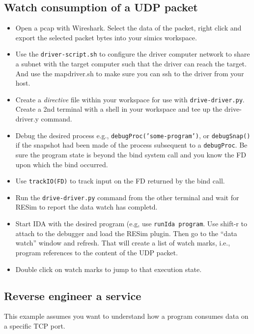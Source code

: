 \documentclass[titlepage]{article}
\begin{document}
\subsection{Watch consumption of a UDP packet}
\begin{itemize}
\item Open a pcap with Wireshark. Select the data of the packet, right click and export the selected packet bytes into your simics workspace.

\item Use the {\tt driver-script.sh} to configure the driver computer network to share a subnet with the target computer such that the driver
can reach the target.  And use the mapdriver.sh to make sure you can ssh to the driver from your host.

\item Create a \textit{directive} file within your workspace for use with {\tt drive-driver.py}.  Create a 2nd terminal with a shell in your workspace
and tee up the drive-driver.y command.

\item Debug the desired process e.g., {\tt debugProc('some-program')}, or {\tt debugSnap()} if the snapshot had been made of the process subsequent
to a {\tt debugProc}.  Be sure the program state is beyond the bind system call and you know the FD upon which the bind occurred.

\item Use {\tt trackIO(FD)} to track input on the FD returned by the bind call.
 
\item Run the {\tt drive-driver.py} command from the other terminal and wait for RESim to report the data watch has completd.

\item Start IDA with the desired program (e.g, use {\tt runIda program}.  Use shift-r to attach to the debugger and load the RESim plugin.
Then go to the ``data watch'' window and refresh.  That will create a list of watch marks, i.e., program references to the content of the UDP packet. 

\item Double click on  watch marks to jump to that execution state.

\end{itemize}

\subsection{Reverse engineer a service}
This example assumes you want to understand how a program consumes
data on a specific TCP port.
\end{document}
